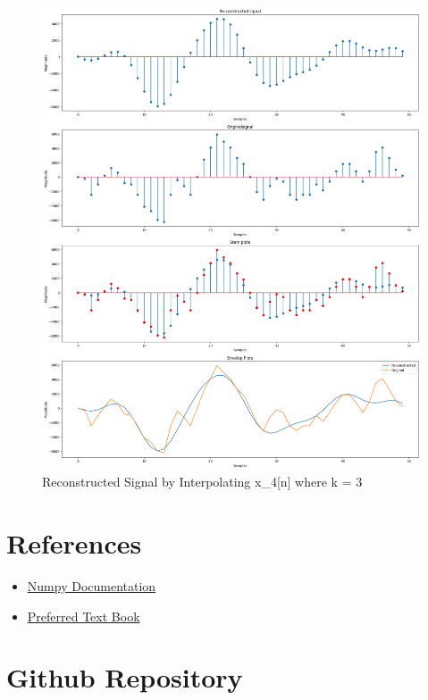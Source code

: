 \documentclass[11pt,a4paper]{article}
\begin{document}
\newpage

{\begin{figure}[h]
    \centering
    \includegraphics[width=1.0\linewidth]{images/5-3.png}
    \caption{Reconstructed Signal by Interpolating x\_4[n] where k = 3}
\end{figure}}


\section{References}

\begin{itemize}
    \item \href{https://numpy.org/doc/}{Numpy Documentation}
    \item \href{https://www.pearson.com/en-us/subject-catalog/p/discrete-time-signal-processing/P200000003226}{Preferred Text Book}
   
\end{itemize}

\section{Github Repository}
\end{document}
